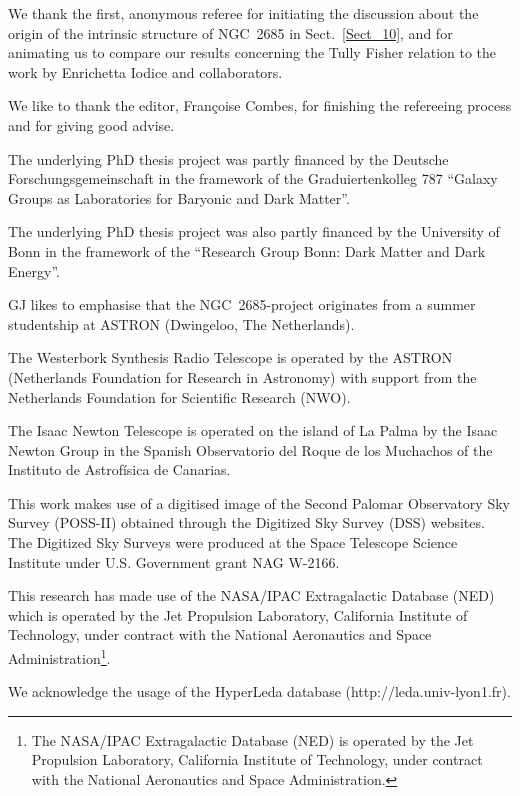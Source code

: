 \documentclass[oldversion]{aa}
\begin{document}
\begin{acknowledgements}
%

We thank the first, anonymous referee for initiating the discussion
about the origin of the intrinsic structure of NGC~2685 in
Sect.~\ref{Sect_10}, and for animating us to compare our results
concerning the Tully Fisher relation to the work by Enrichetta Iodice
and collaborators.

We like to thank the editor, Fran\c{c}oise Combes, for finishing the refereeing process and for giving good advise.

The underlying PhD thesis project was partly financed by the Deutsche
Forschungsgemeinschaft in the framework of the Graduiertenkolleg 787
``Galaxy Groups as Laboratories for Baryonic and Dark Matter''.

The underlying PhD thesis project was also partly financed by the
University of Bonn in the framework of the ``Research Group Bonn: Dark
Matter and Dark Energy''.

GJ likes to emphasise that the NGC~2685-project originates from a
summer studentship at ASTRON (Dwingeloo, The Netherlands).

The Westerbork Synthesis Radio Telescope is operated by the ASTRON
(Netherlands Foundation for Research in Astronomy) with support from
the Netherlands Foundation for Scientific Research (NWO).

The Isaac Newton Telescope is operated on the island of La Palma by
the Isaac Newton Group in the Spanish Observatorio del Roque de los
Muchachos of the Instituto de Astrof\'isica de Canarias.

This work makes use of a digitised image of the Second Palomar
Observatory Sky Survey (POSS-II) obtained through the Digitized Sky
Survey (DSS) websites. The Digitized Sky Surveys were produced at the
Space Telescope Science Institute under U.S. Government grant NAG
W-2166.

This research has made use of the NASA/IPAC Extragalactic Database
(NED) which is operated by the Jet Propulsion Laboratory, California
Institute of Technology, under contract with the National Aeronautics
and Space Administration\footnote{The NASA/IPAC Extragalactic Database
(NED) is operated by the Jet Propulsion Laboratory, California
Institute of Technology, under contract with the National Aeronautics
and Space Administration.}.

We acknowledge the usage of the HyperLeda database (http://leda.univ-lyon1.fr).
\end{acknowledgements}
\end{document}

